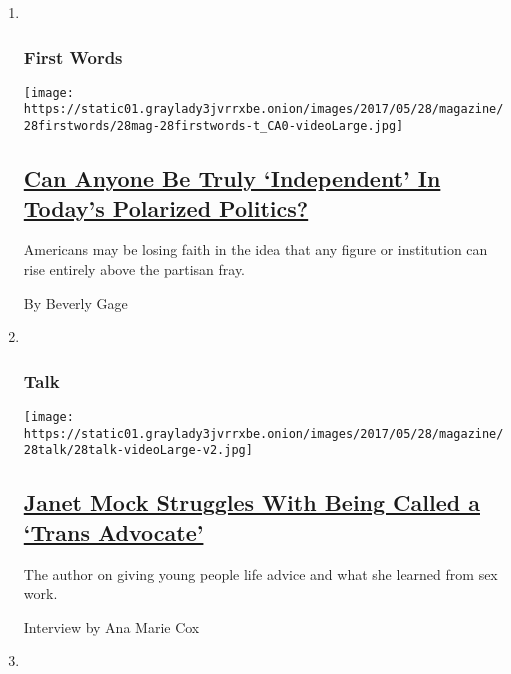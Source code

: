 \begin{enumerate}
\def\labelenumi{\arabic{enumi}.}
\item ~
  \hypertarget{first-words}{%
  \subsubsection{First Words}\label{first-words}}

  \texttt{[image: https://static01.graylady3jvrrxbe.onion/images/2017/05/28/magazine/28firstwords/28mag-28firstwords-t\_CA0-videoLarge.jpg]}

  \hypertarget{can-anyone-be-truly-independent-in-todays-polarized-politics}{%
  \subsection{\texorpdfstring{\href{/2017/05/23/magazine/can-anyone-be-truly-independent-in-todays-polarized-politics.html}{Can
  Anyone Be Truly `Independent' In Today's Polarized
  Politics?}}{Can Anyone Be Truly `Independent' In Today's Polarized Politics?}}\label{can-anyone-be-truly-independent-in-todays-polarized-politics}}

  Americans may be losing faith in the idea that any figure or
  institution can rise entirely above the partisan fray.

  By Beverly Gage
\item ~
  \hypertarget{talk}{%
  \subsubsection{Talk}\label{talk}}

  \texttt{[image: https://static01.graylady3jvrrxbe.onion/images/2017/05/28/magazine/28talk/28talk-videoLarge-v2.jpg]}

  \hypertarget{janet-mock-struggles-with-being-called-a-trans-advocate}{%
  \subsection{\texorpdfstring{\href{/2017/05/24/magazine/janet-mock-struggles-with-being-called-a-trans-advocate.html}{Janet
  Mock Struggles With Being Called a `Trans
  Advocate'}}{Janet Mock Struggles With Being Called a `Trans Advocate'}}\label{janet-mock-struggles-with-being-called-a-trans-advocate}}

  The author on giving young people life advice and what she learned
  from sex work.

  Interview by Ana Marie Cox
\item ~
  \hypertarget{eat}{%
}
\end{enumerate}
